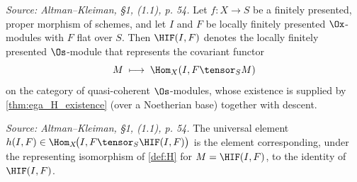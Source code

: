 \begin{definition}
  \label{def:H}
  \textit{Source: Altman--Kleiman, §1, (1.1), p. 54.}
  Let $f : X \to S$ be a finitely presented, proper morphism of schemes, and let
  $I$ and $F$ be locally finitely presented $\Ox$-modules with $F$ flat over $S$.
  Then $\HIF(I,F)$ denotes the locally finitely presented $\Os$-module that
  represents the covariant functor
  \[
    M \;\longmapsto\; \Hom_X(I, F \tensor_S M)
  \]
  on the category of quasi-coherent $\Os$-modules, whose existence is supplied by
  \cref{thm:ega_H_existence} (over a Noetherian base) together with descent.
\end{definition}

\begin{definition}
  \label{def:h}
  \textit{Source: Altman--Kleiman, §1, (1.1), p. 54.}
  The universal element $h(I,F) \in \Hom_X\!\big(I, F \tensor_S \HIF(I,F)\big)$ is
  the element corresponding, under the representing isomorphism of \cref{def:H}
  for $M = \HIF(I,F)$, to the identity of $\HIF(I,F)$.
\end{definition}

